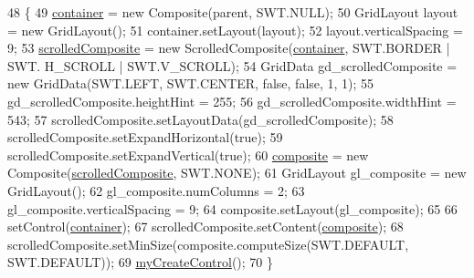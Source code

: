 \begin{DoxyCode}
48                                                 \{
49         \hyperlink{classit_1_1isislab_1_1masonhelperdocumentation_1_1mason_1_1wizards_1_1_f___agent_variables_page_aa9f4b2d9a3bfc361d12d8832f8f7e212}{container} = \textcolor{keyword}{new} Composite(parent, SWT.NULL);
50         GridLayout layout = \textcolor{keyword}{new} GridLayout();
51         container.setLayout(layout);
52         layout.verticalSpacing = 9;     
53         \hyperlink{classit_1_1isislab_1_1masonhelperdocumentation_1_1mason_1_1wizards_1_1_f___agent_variables_page_a95b20ea3356cda7bd73e9507e43859eb}{scrolledComposite} = \textcolor{keyword}{new} ScrolledComposite(\hyperlink{classit_1_1isislab_1_1masonhelperdocumentation_1_1mason_1_1wizards_1_1_f___agent_variables_page_aa9f4b2d9a3bfc361d12d8832f8f7e212}{container}, SWT.BORDER | SWT.
      H\_SCROLL | SWT.V\_SCROLL);
54         GridData gd\_scrolledComposite = \textcolor{keyword}{new} GridData(SWT.LEFT, SWT.CENTER, \textcolor{keyword}{false}, \textcolor{keyword}{false}, 1, 1);
55         gd\_scrolledComposite.heightHint = 255;
56         gd\_scrolledComposite.widthHint = 543;
57         scrolledComposite.setLayoutData(gd\_scrolledComposite);
58         scrolledComposite.setExpandHorizontal(\textcolor{keyword}{true});
59         scrolledComposite.setExpandVertical(\textcolor{keyword}{true});      
60         \hyperlink{classit_1_1isislab_1_1masonhelperdocumentation_1_1mason_1_1wizards_1_1_f___agent_variables_page_a9b95e0b06f6e0d96b7497478df0e5960}{composite} = \textcolor{keyword}{new} Composite(\hyperlink{classit_1_1isislab_1_1masonhelperdocumentation_1_1mason_1_1wizards_1_1_f___agent_variables_page_a95b20ea3356cda7bd73e9507e43859eb}{scrolledComposite}, SWT.NONE);
61         GridLayout gl\_composite = \textcolor{keyword}{new} GridLayout();
62         gl\_composite.numColumns = 2;
63         gl\_composite.verticalSpacing = 9;
64         composite.setLayout(gl\_composite);      
65         
66         setControl(\hyperlink{classit_1_1isislab_1_1masonhelperdocumentation_1_1mason_1_1wizards_1_1_f___agent_variables_page_aa9f4b2d9a3bfc361d12d8832f8f7e212}{container});
67         scrolledComposite.setContent(\hyperlink{classit_1_1isislab_1_1masonhelperdocumentation_1_1mason_1_1wizards_1_1_f___agent_variables_page_a9b95e0b06f6e0d96b7497478df0e5960}{composite});
68         scrolledComposite.setMinSize(composite.computeSize(SWT.DEFAULT, SWT.DEFAULT));      
69         \hyperlink{classit_1_1isislab_1_1masonhelperdocumentation_1_1mason_1_1wizards_1_1_f___agent_variables_page_a182a280459538ed143e8cd15904dd7c3}{myCreateControl}();
70     \}
\end{DoxyCode}


